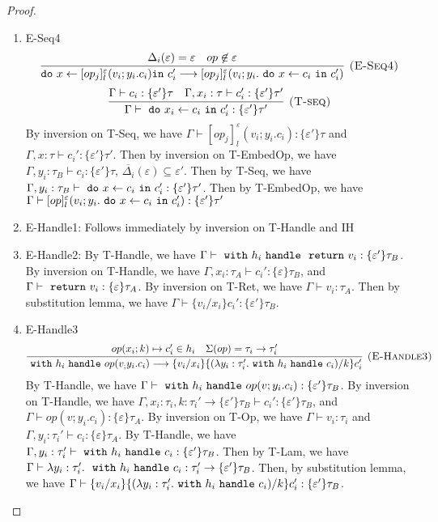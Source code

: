 \begin{lemma}
\begin{proof}
\begin{enumerate}
\item E-Seq4
$$
\infer[\textsc{(E-Seq4)}]
  {\texttt{do}\ x \leftarrow [op_j]^\varepsilon_l(v_i; y_i.c_i) \texttt{in}\ c_i' \longrightarrow [op_j]^\varepsilon_l(v_i; y_i. \m{do} x \leftarrow c_i \m{in} c_i')}
  {\Delta_i(\varepsilon) = \varepsilon & op \not \in \varepsilon} $$
$$
\infer[\textsc{(T-seq)}]
  {\Gamma\vdash \m{do} x_i \leftarrow c_i \m{in} c_i' : \{\varepsilon'\}\tau' }
  {\Gamma \vdash c_i : \{\varepsilon'\}\tau & \Gamma, x_i:\tau \vdash c_i': \{\varepsilon'\}\tau'}  $$
By inversion on T-Seq, we have $\Gamma \vdash [op_j]^\varepsilon_l(v_i; y_i.c_i): \{\varepsilon'\}\tau$ and $\Gamma, x:\tau \vdash c_i' : \{\varepsilon'\} \tau'$. Then by inversion on T-EmbedOp, we have $\Gamma, y_i:\tau_B \vdash c_i: \{\varepsilon'\}\tau$, $\overline{\Delta_i}(\varepsilon) \subseteq \varepsilon'$.
Then by T-Seq, we have $\Gamma, y_i:\tau_B \vdash \ \texttt{do}\  x \leftarrow c_i \ \texttt{in}\  c_i' : \{\varepsilon'\}\tau'$. Then by T-EmbedOp, we have $\Gamma \vdash [op]^\varepsilon_l(v_i; y_i.  \ \texttt{do}\  x \leftarrow c_i \ \texttt{in}\  c_i' ): \{\varepsilon'\}\tau'$

\item E-Handle1: Follows immediately by inversion on T-Handle and IH
\item E-Handle2: By T-Handle, we have $\Gamma \vdash \ \texttt{with}\  h_i \ \texttt{handle}\  \ \texttt{return}\  v_i :  \{\varepsilon'\}\tau_B$. By inversion on T-Handle, we have $\Gamma, x_i:\tau_A \vdash c_i' : \{\varepsilon\}\tau_B$, and $\Gamma \vdash \ \texttt{return}\  v_i : \{\varepsilon\} \tau_A$. By inversion on T-Ret, we have $\Gamma \vdash v_i : \tau_A$. Then by substitution lemma, we have $\Gamma \vdash \{v_i/x_i\}c_i' : \{\varepsilon'\}\tau_B$. 

\item E-Handle3
$$
\infer[\textsc{(E-Handle3)}]
  {\m{with} h_i \m{handle} op(v_; y_i.c_i) \longrightarrow \{v_i/x_i\} \{(\lambda y_i: \tau_i'.
   \m{with} h_i\m{handle} c_i) / k\}c_i' }
  {op(x_i; k) \mapsto c_i' \in h_i & \Sigma(op) = \tau_i \rightarrow \tau_i'} 
$$
By T-Handle, we have $\Gamma \vdash \ \texttt{with}\  h_i \ \texttt{handle}\  op(v;y_i.c_i) :  \{\varepsilon'\}\tau_B$. By inversion on T-Handle, we have $\Gamma, x_i:\tau_i, k: \tau_i' \rightarrow \{\varepsilon'\}\tau_B \vdash c_i' : \{\varepsilon'\} \tau_B$, and $\Gamma \vdash op(v; y_i.c_i) : \{\varepsilon\} \tau_A$. By inversion on T-Op, we have $\Gamma \vdash v_i : \tau_i$ and $\Gamma, y_i: \tau_i' \vdash c_i: \{\varepsilon\}\tau_A$. By T-Handle, we have $\Gamma, y_i: \tau_i' \vdash \ \texttt{with}\  h_i \ \texttt{handle}\  c_i : \{\varepsilon'\}\tau_B$. Then by T-Lam, we have $\Gamma \vdash \lambda y_i:\tau_i'.\ \ \texttt{with}\  h_i \ \texttt{handle}\  c_i : \tau_i' \rightarrow  \{\varepsilon'\}\tau_B$. Then, by substitution lemma, we have $\Gamma \vdash \{v_i/x_i\} \{(\lambda y_i: \tau_i'.
   \ \texttt{with}\  h_i\ \texttt{handle}\  c_i) / k\}c_i' : \{\varepsilon'\}\tau_B$.
   

\end{enumerate}
\end{proof}
\end{lemma}
